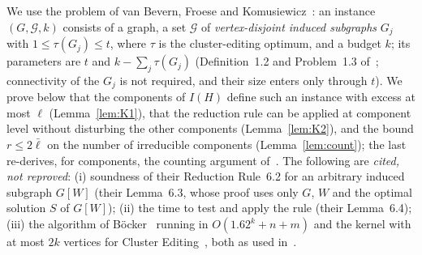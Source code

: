 We use the problem of van Bevern, Froese and Komusiewicz~\cite{BFK18}: an instance $(G,\mathcal G,k)$ consists of a graph, a set $\mathcal G$ of \emph{vertex-disjoint induced subgraphs} $G_j$ with $1\le\tau(G_j)\le t$, where $\tau$ is the cluster-editing optimum, and a budget $k$; its parameters are $t$ and $k-\sum_j\tau(G_j)$ (Definition~1.2 and Problem~1.3 of~\cite{BFK18}; connectivity of the $G_j$ is not required, and their size enters only through $t$). We prove below that the components of $I(H)$ define such an instance with excess at most $\ell$ (Lemma~\ref{lem:K1}), that the reduction rule can be applied at component level without disturbing the other components (Lemma~\ref{lem:K2}), and the bound $r\le2\bar\ell$ on the number of irreducible components (Lemma~\ref{lem:count}); the last re-derives, for components, the counting argument of~\cite[Lemmas~3.2 and~6.5]{BFK18}. The following are \emph{cited, not reproved}: (i) soundness of their Reduction Rule~6.2 for an arbitrary induced subgraph $G[W]$ (their Lemma~6.3, whose proof uses only $G$, $W$ and the optimal solution $S$ of $G[W]$); (ii) the time to test and apply the rule (their Lemma~6.4); (iii) the algorithm of B\"ocker~\cite{Boe12} running in $O(1.62^k+n+m)$ and the kernel with at most $2k$ vertices for Cluster Editing~\cite{CM12}, both as used in~\cite{BFK18}.

